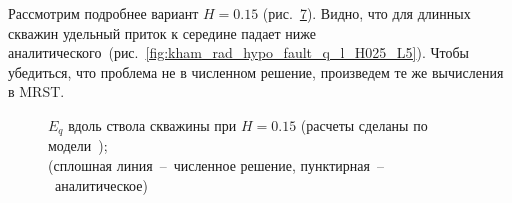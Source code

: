 \documentclass{article}
\begin{document}
Рассмотрим подробнее вариант $H=0.15$ (рис.~\ref{fig:kham_rad_hypo_fault_q_l_constH015}).
Видно, что для длинных скважин удельный приток к середине падает ниже
аналитического~(рис.~\ref{fig:kham_rad_hypo_fault_q_l_H025_L5}).
Чтобы убедиться, что проблема не в численном решение, произведем те же вычисления в MRST.

\begin{figure}[h!]
\centering
\begin{subfigure}{0.45\textwidth}

\caption{}
\label{fig:kham_rad_hypo_fault_q_l_constH015_L05}
\end{subfigure}
\hfill
\begin{subfigure}{0.45\textwidth}

\caption{}
\label{fig:kham_rad_hypo_fault_q_l_constH015_L1}
\end{subfigure}

\begin{subfigure}{0.45\textwidth}

\caption{}
\label{fig:kham_rad_hypo_fault_q_l_constH015_L2}
\end{subfigure}
\hfill
\begin{subfigure}{0.45\textwidth}

\caption{}
\label{fig:kham_rad_hypo_fault_q_l_constH015_L3}
\end{subfigure}

\begin{subfigure}{0.45\textwidth}

\caption{}
\label{fig:kham_rad_hypo_fault_q_l_constH015_L5}
\end{subfigure}
\hfill
\begin{subfigure}{0.45\textwidth}

\caption{}
\label{fig:kham_rad_hypo_fault_q_l_constH015_L10}
\end{subfigure}

\caption{
$E_q$ вдоль ствола скважины при $H=0.15$
(расчеты сделаны по модели~\cite{lit:kham_mazo_uzku_2015}); \\
(сплошная линия~--~численное решение, пунктирная~--~аналитическое)}
\label{fig:kham_rad_hypo_fault_q_l_constH015}
\end{figure}
\end{document}
